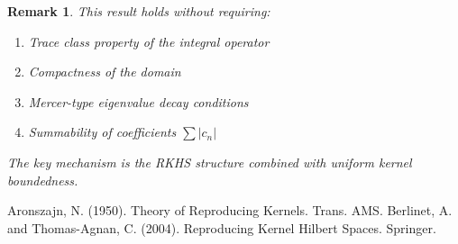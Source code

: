 \documentclass{article}
\newtheorem{remark}{Remark}
\begin{document}
\begin{remark}
This result holds without requiring:
\begin{enumerate}
    \item Trace class property of the integral operator
    \item Compactness of the domain
    \item Mercer-type eigenvalue decay conditions
    \item Summability of coefficients $\sum |c_n|$
\end{enumerate}
The key mechanism is the RKHS structure combined with uniform kernel boundedness.
\end{remark}

\begin{thebibliography}{9}
 Aronszajn, N. (1950). Theory of Reproducing Kernels. Trans. AMS.
 Berlinet, A. and Thomas-Agnan, C. (2004). Reproducing Kernel Hilbert Spaces. Springer.
\end{thebibliography}
\end{document}
